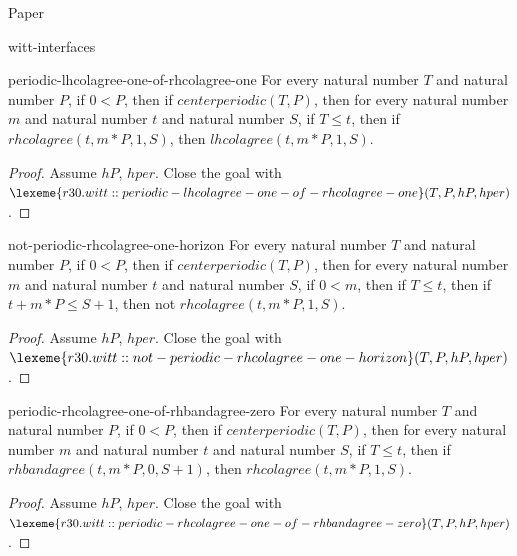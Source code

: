\begin{lexlean}{Paper}
\begin{section}{witt-interfaces}
  \begin{theorem}{periodic-lhcolagree-one-of-rhcolagree-one}
  For every natural number \(T\) and natural number \(P\), if \(0 < P\), then if \(centerperiodic(T, P)\), then for every natural number \(m\) and natural number \(t\) and natural number \(S\), if \(T ≤ t\), then if \(rhcolagree(t, m * P, 1, S)\), then \(lhcolagree(t, m * P, 1, S)\).
  \begin{proof}
  Assume \(hP\), \(hper\).
  Close the goal with \(\lexeme{r30.witt::periodic-lhcolagree-one-of-rhcolagree-one}(T, P, hP, hper)\).
  \end{proof}
  \end{theorem}

  \begin{theorem}{not-periodic-rhcolagree-one-horizon}
  For every natural number \(T\) and natural number \(P\), if \(0 < P\), then if \(centerperiodic(T, P)\), then for every natural number \(m\) and natural number \(t\) and natural number \(S\), if \(0 < m\), then if \(T ≤ t\), then if \(t + m * P ≤ S + 1\), then not \(rhcolagree(t, m * P, 1, S)\).
  \begin{proof}
  Assume \(hP\), \(hper\).
  Close the goal with \(\lexeme{r30.witt::not-periodic-rhcolagree-one-horizon}(T, P, hP, hper)\).
  \end{proof}
  \end{theorem}

  \begin{theorem}{periodic-rhcolagree-one-of-rhbandagree-zero}
  For every natural number \(T\) and natural number \(P\), if \(0 < P\), then if \(centerperiodic(T, P)\), then for every natural number \(m\) and natural number \(t\) and natural number \(S\), if \(T ≤ t\), then if \(rhbandagree(t, m * P, 0, S + 1)\), then \(rhcolagree(t, m * P, 1, S)\).
  \begin{proof}
  Assume \(hP\), \(hper\).
  Close the goal with \(\lexeme{r30.witt::periodic-rhcolagree-one-of-rhbandagree-zero}(T, P, hP, hper)\).
  \end{proof}
  \end{theorem}


\end{section}
\end{lexlean}
